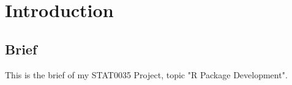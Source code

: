 \chapter{Introduction}

\section{Brief}
This is the brief of my STAT0035 Project, topic "R Package Development".
